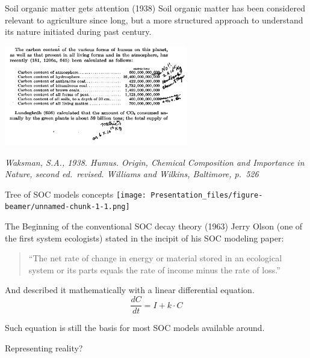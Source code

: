 \documentclass[
  ignorenonframetext,
]{beamer}
\begin{document}
\begin{frame}{Soil organic matter gets attention (1938)}
\protect\hypertarget{soil-organic-matter-gets-attention-1938}{}
Soil organic matter has been considered relevant to agriculture since
long, but a more structured approach to understand its nature initiated
during past century.

\includegraphics[width=0.6\textwidth,height=\textheight]{waksman_1938.png}

\emph{Waksman, S.A., 1938. Humus. Origin, Chemical Composition and
Importance in Nature, second ed.~revised. Williams and Wilkins,
Baltimore, p.~526}
\end{frame}

\begin{frame}{Tree of SOC models concepts}
\protect\hypertarget{tree-of-soc-models-concepts}{}
\texttt{[image: Presentation\_files/figure-beamer/unnamed-chunk-1-1.png]}
\end{frame}

\begin{frame}{The Beginning of the conventional SOC decay theory (1963)}
\protect\hypertarget{the-beginning-of-the-conventional-soc-decay-theory-1963}{}
Jerry Olson (one of the first system ecologists) stated in the incipit
of his SOC modeling paper:

\begin{quote}
``The net rate of change in energy or material stored in an ecological
system or its parts equals the rate of income minus the rate of loss.''
\end{quote}

And described it mathematically with a linear differential equation. \[
\frac{dC}{dt} = I + k \cdot C
\]

Such equation is still the basis for most SOC models available around.
\end{frame}

\begin{frame}{Representing reality?}
\protect\hypertarget{representing-reality}{}
\end{frame}
\end{document}
